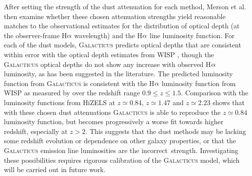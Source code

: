 After setting the strength of the dust attenuation for each method,
Merson et al. then examine whether these chosen attenuation strengths yield
reasonable matches to the observational estimates for the distribution
of optical depth (at the observer-frame H${\rm \alpha}$ wavelength)
and the H${\rm \alpha}$ line luminosity function. For each of the dust
models, \textsc{Galacticus} predicts optical depths that are
consistent within error with the optical depth estimates from WISP
\citep{Dominguez13}, though the \textsc{Galacticus} optical depths do
not show any increase with observed H${\rm \alpha}$ luminosity, as has
been suggested in the literature. The predicted luminosity function
from \textsc{Galacticus} is consistent with the H${\rm \alpha}$
luminosity function from WISP as measured by \citet{Colbert13} over the redshift range $0.9\leqslant z \leqslant 1.5$. Comparison with the luminosity functions from HiZELS \citep{Sobral13} at $z\simeq 0.84$, $z\simeq 1.47$ and $z\simeq 2.23$
shows that with these chosen dust attenuations \textsc{Galacticus} is
able to reproduce the $z\simeq 0.84$ luminosity function, but becomes
progressively a worse fit towards higher redshift, especially at
$z>2$. This suggests that the dust methods may be lacking some
redshift evolution or dependence on other galaxy properties, or that
the \textsc{Galacticus} emission line luminosities are the
incorrect\ strength. Investigating these possibilities requires
rigorous calibration of the \textsc{Galacticus} model, which will be
carried out in future work.

